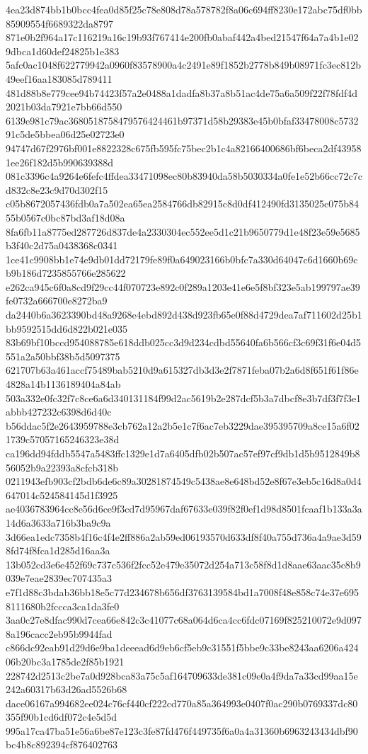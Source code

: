 {4ea23d874bb1b0bcc4fea0d85f25c78e808d78a578782f8a06c694ff8230e172abc75df0bb85909554f6689322da8797
871e0b2f964a17c116219a16c19b93f767414e200fb0abaf442a4bed21547f64a7a4b1e029dbca1d60def24825b1e383
5afc0ac1048f622779942a0960f83578900a4c2491e89f1852b2778b849b08971fc3ec812b49eef16aa183085d789411
481d88b8e779cee94b74423f57a2e0488a1dadfa8b37a8b51ac4de75a6a509f22f78fdf4d2021b03da7921e7bb66d550
6139e981c79ac3680518758479576424461b97371d58b29383e45b0bfaf33478008c573291c5de5bbea06d25e02723e0
94747d67f2976bf001e8822328c675fb595fc75bec2b1c4a82166400686bf6beca2df439581ee26f182d5b990639388d
081c3396c4a9264e6fefc4ffdea33471098ec80b83940da58b5030334a0fe1e52b66cc72c7cd832c8e23c9d70d302f15
c05b8672057436fdb0a7a502ea65ea2584766db82915c8d0df412490fd3135025c075b8455b0567c0bc87bd3af18d08a
8fa6fb11a8775ed287726d837de4a2330304ec552ee5d1c21b9650779d1e48f23e59e5685b3f40c2d75a0438368c0341
1ce41c9908bb1e74e9db01dd72179fe89f0a649023166b0bfc7a330d64047c6d1660b69cb9b186d7235855766e285622
e262ca945c6f0a8cd9f29cc44f070723e892c0f289a1203e41e6e5f8bf323e5ab199797ae39fe0732a666700e8272ba9
da2440b6a3623390bd48a9268e4ebd892d438d923fb65e0f88d4729dea7af711602d25b1bb9592515dd6d822b021e035
83b69bf10bccd954088785e618ddb025cc3d9d234cdbd55640fa6b566cf3c69f31f6e04d5551a2a50bbf38b5d5097375
621707b63a461accf75489bab5210d9a615327db3d3e2f7871feba07b2a6d8f651f61f86e4828a14b1136189404a84ab
503a332e0fc32f7c8ce6a6d340131184f99d2ac5619b2e287dcf5b3a7dbcf8e3b7df3f7f3e1abbb427232c6398d6d40c
b56ddac5f2e2643959788e3cb762a12a2b5e1c7f6ac7eb3229dae395395709a8ce15a6f021739c57057165246323e38d
ca196dd94fddb5547a5483ffc1329e1d7a6405dfb02b507ac57ef97cf9db1d5b9512849b856052b9a22393a8cfcb318b
0211943efb903cf2bdb6de6c89a30281874549c5438ae8e648bd52e8f67e3eb5c16d8a0d4647014c524584145d1f3925
ae4036783964cc8e56d6ce9f3cd7d95967daf67633e039f82f0ef1d98d8501fcaaf1b133a3a14d6a3633a716b3ba9c9a
3d66ea1edc7358b4f16c4f4e2ff886a2ab59ed06193570d633df8f40a755d736a4a9ae3d598fd74f8fca1d285d16aa3a
13b052cd3e6e452f69c737c536f2fcc52e479e35072d254a713c58f8d1d8aae63aac35c8b9039e7eae2839ec707435a3
e7f1d88c3bdab36bb18e5c77d234678b656df3763139584bd1a7008f48e858c74e37e6958111680b2fccca3ca1da3fe0
3aa0c27e8dfac990d7cea66e842c3c41077c68a064d6ca4cc6fdc07169f825210072e9d0978a196cacc2eb95b9944fad
c866dc92eab91d29d6e9ba1deeead6d9eb6cf5eb9c31551f5bbe9c33be8243aa6206a42406b20bc3a1785de2f85b1921
228742d2513c2be7a0d928bca83a75c5af164709633de381c09e0a4f9da7a33cd99aa15e242a60317b63d26ad5526b68
dace06167a994682ee024c76cf440cf222cd770a85a364993e0407f0ac290b0769337dc80355f90b1cd6df072c4e5d5d
995a17ca47ba51e56a6be87e123c3fe87fd476f449735f6a0a4a31360b6963243434dbf90bc4b8c892394cf876402763
}

